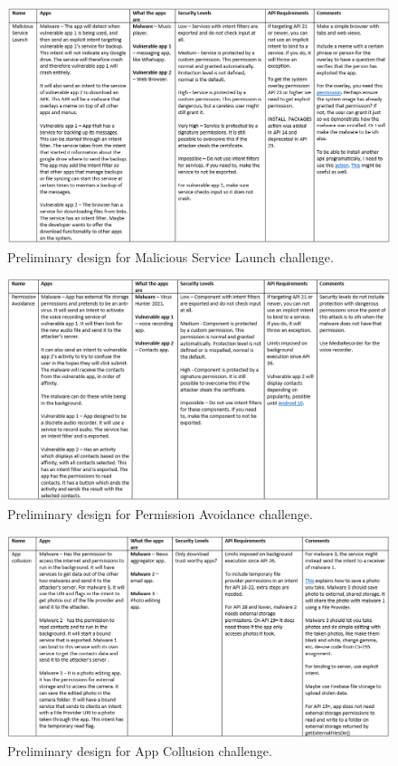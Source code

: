 \begin{landscape}
    \begin{figure}[h]
        \centering
        \includegraphics[width=1.4\textwidth]{graphics/malicious_service_launch.PNG}
        \caption{Preliminary design for Malicious Service Launch challenge.}
        \label{fig:malicious_service_launch_design}
    \end{figure}
    
    \begin{figure}[h]
        \centering
        \includegraphics[width=1.4\textwidth]{graphics/permission_avoidance.PNG}
        \caption{Preliminary design for Permission Avoidance challenge.}
        \label{fig:permission_avoidance_design}
    \end{figure}
    
    \begin{figure}[h]
        \centering
        \includegraphics[width=1.4\textwidth]{graphics/app_collusion.PNG}
        \caption{Preliminary design for App Collusion challenge.}
        \label{fig:app_collusion_design}
    \end{figure}
\end{landscape}

